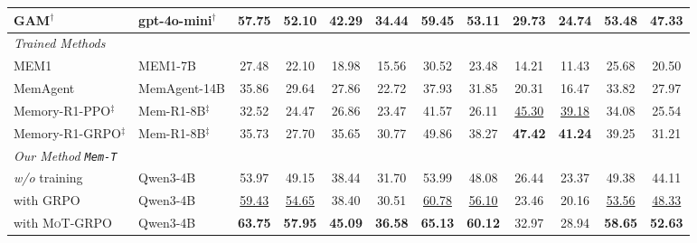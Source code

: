 \documentclass[11pt, a4paper]{lumia}
\newcommand{\ourmethod}{{\texttt{Mem-T}}\xspace} %
\newcommand{\ourtrain}{{\textsc{MoT-GRPO}}\xspace} %
\begin{document}
\begin{table}[!ht]
{\begin{tabular}{llcccccccccc}
        \color{gray} GAM$^{\dagger}$  & \color{gray} gpt-4o-mini$^{\dagger}$ & \color{gray} 57.75 & \color{gray}52.10 & \color{gray}42.29 & \color{gray}34.44 & \color{gray}59.45 & \color{gray}53.11 & \color{gray}29.73 & \color{gray}24.74 & \color{gray}53.48 & \color{gray}47.33 \\
        \midrule
        \multicolumn{12}{l}{\textit{Trained Methods}} \\
        MEM1  & MEM1-7B & 27.48 & 22.10 & 18.98 & 15.56 & 30.52 & 23.48 & 14.21 & 11.43 & 25.68 & 20.50 \\
        MemAgent & MemAgent-14B & 35.86 & 29.64 & 27.86 & 22.72 & 37.93 & 31.85 & 20.31 & 16.47 & 33.82 & 27.97 \\
        Memory-R1-PPO$^{\ddagger}$  & Mem-R1-8B$^{\ddagger}$ & 32.52 & 24.47 & 26.86 & 23.47 & 41.57 & 26.11 & \underline{45.30} & \underline{39.18} & 34.08 & 25.54 \\
        Memory-R1-GRPO$^{\ddagger}$  & Mem-R1-8B$^{\ddagger}$ & 35.73 & 27.70 & 35.65 & 30.77 & 49.86 & 38.27 & \textbf{47.42} & \textbf{41.24} & 39.25 & 31.21 \\
        \midrule
        \multicolumn{12}{l}{\textit{Our Method \ourmethod}} \\
        \textit{w/o} training & Qwen3-4B & 53.97 & 49.15 & 38.44 & 31.70 & 53.99 & 48.08 & 26.44 & 23.37 & 49.38 & 44.11 \\
        with GRPO & Qwen3-4B & \underline{59.43} & \underline{54.65} & 38.40 & 30.51 & \underline{60.78} & \underline{56.10} & 23.46 & 20.16 & \underline{53.56} & \underline{48.33} \\
        with \ourtrain & Qwen3-4B & \textbf{63.75} & \textbf{57.95} & \textbf{45.09} & \textbf{36.58} & \textbf{65.13} & \textbf{60.12} & 32.97 & 28.94 & \textbf{58.65} & \textbf{52.63} \\
        \bottomrule
    \end{tabular}%
    }
    \vspace{-0.5em}
\end{table}
\end{document}
